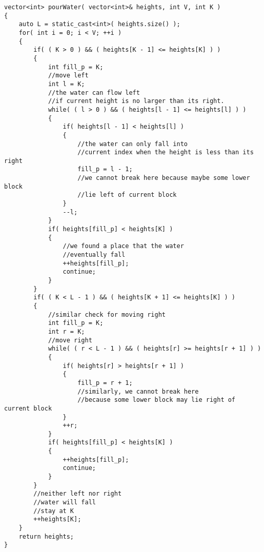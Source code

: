 \setcounter{lstlisting}{0}
\begin{lstlisting}[style=customc, caption={Simulation}]
vector<int> pourWater( vector<int>& heights, int V, int K )
{
    auto L = static_cast<int>( heights.size() );
    for( int i = 0; i < V; ++i )
    {
        if( ( K > 0 ) && ( heights[K - 1] <= heights[K] ) )
        {
            int fill_p = K;
            //move left
            int l = K;
            //the water can flow left
            //if current height is no larger than its right.
            while( ( l > 0 ) && ( heights[l - 1] <= heights[l] ) )
            {
                if( heights[l - 1] < heights[l] )
                {
                    //the water can only fall into
                    //current index when the height is less than its right
                    fill_p = l - 1;
                    //we cannot break here because maybe some lower block
                    //lie left of current block
                }
                --l;
            }
            if( heights[fill_p] < heights[K] )
            {
                //we found a place that the water
                //eventually fall
                ++heights[fill_p];
                continue;
            }
        }
        if( ( K < L - 1 ) && ( heights[K + 1] <= heights[K] ) )
        {
            //similar check for moving right
            int fill_p = K;
            int r = K;
            //move right
            while( ( r < L - 1 ) && ( heights[r] >= heights[r + 1] ) )
            {
                if( heights[r] > heights[r + 1] )
                {
                    fill_p = r + 1;
                    //similarly, we cannot break here
                    //because some lower block may lie right of current block
                }
                ++r;
            }
            if( heights[fill_p] < heights[K] )
            {
                ++heights[fill_p];
                continue;
            }
        }
        //neither left nor right
        //water will fall
        //stay at K
        ++heights[K];
    }
    return heights;
}
\end{lstlisting}